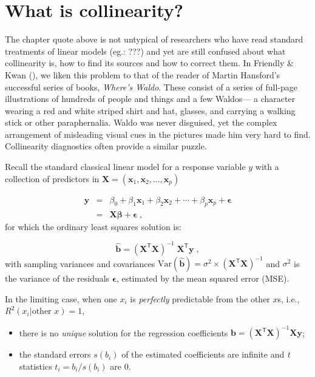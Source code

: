 \documentclass[
  letterpaper,
  10pt,
  krantz2]{krantz}
\providecommand{\tightlist}{%
  \setlength{\itemsep}{0pt}\setlength{\parskip}{0pt}}\usepackage{longtable,booktabs,array}
\begin{document}
\section{What is collinearity?}\label{what-is-collinearity}

The chapter quote above is not untypical of researchers who have read
standard treatments of linear models (eg.: ???) and yet are still
confused about what collinearity is, how to find its sources and how to
correct them. In Friendly \& Kwan
(), we liken this problem to that
of the reader of Martin Hansford's successful series of books,
\emph{Where's Waldo}. These consist of a series of full-page
illustrations of hundreds of people and things and a few Waldos--- a
character wearing a red and white striped shirt and hat, glasses, and
carrying a walking stick or other paraphernalia. Waldo was never
disguised, yet the complex arrangement of misleading visual cues in the
pictures made him very hard to find. Collinearity diagnostics often
provide a similar puzzle.

Recall the standard classical linear model for a response variable \(y\)
with a collection of predictors in
\(\mathbf{X} = (\mathbf{x}_1, \mathbf{x}_2, ..., \mathbf{x}_p)\)

\begin{eqnarray*}
\mathbf{y} & =&  \beta_0 + \beta_1 \mathbf{x}_1 + \beta_2 \mathbf{x}_2 + \cdots + \beta_p \mathbf{x}_p + \mathbf{\epsilon} \\
         & = & \mathbf{X} \mathbf{\beta} + \mathbf{\epsilon} \; ,
\end{eqnarray*} for which the ordinary least squares solution is:

\[
\widehat{\mathbf{b}} = (\mathbf{X}^\mathsf{T} \mathbf{X})^{-1} \; \mathbf{X}^\mathsf{T} \mathbf{y} \; ,
\] with sampling variances and covariances
\(\text{Var} (\widehat{\mathbf{b}}) = \sigma^2 \times (\mathbf{X}^\mathsf{T} \mathbf{X})^{-1}\)
and \(\sigma^2\) is the variance of the residuals \(\mathbf{\epsilon}\),
estimated by the mean squared error (MSE).

In the limiting case, when one \(x_i\) is \emph{perfectly} predictable
from the other \(x\)s, i.e., \(R^2 (x_i | \text{other }x) = 1\),

\begin{itemize}
\tightlist
\item
  there is no \emph{unique} solution for the regression coefficients
  \(\mathbf{b} = (\mathbf{X}^\mathsf{T} \mathbf{X})^{-1} \mathbf{X} \mathbf{y}\);
\item
  the standard errors \(s (b_i)\) of the estimated coefficients are
  infinite and \emph{t} statistics \(t_i = b_i / s (b_i)\) are 0.
\end{itemize}
\end{document}
